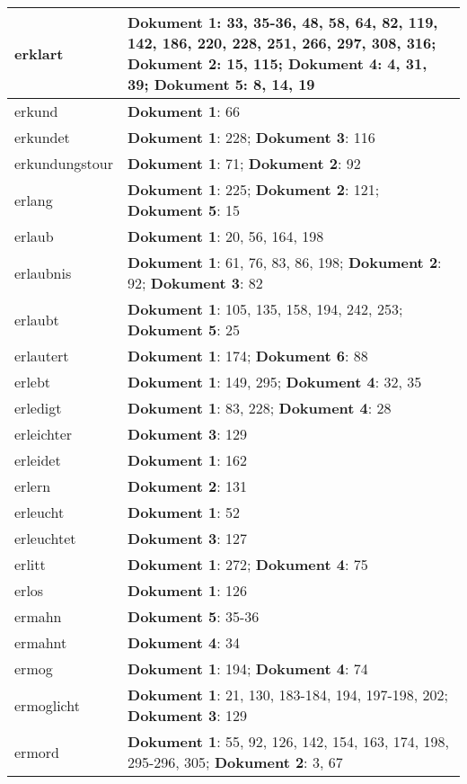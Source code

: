 \documentclass[a5paper]{article}
\begin{document}
\begin{longtable}[l]{|l|p{3in}|}
\hline
erklart & \textbf{Dokument 1}: 33, 35-36, 48, 58, 64, 82, 119, 142, 186, 220, 228, 251, 266, 297, 308, 316; \textbf{Dokument 2}: 15, 115; \textbf{Dokument 4}: 4, 31, 39; \textbf{Dokument 5}: 8, 14, 19 \\
\hline
erkund & \textbf{Dokument 1}: 66 \\
\hline
erkundet & \textbf{Dokument 1}: 228; \textbf{Dokument 3}: 116 \\
\hline
erkundungstour & \textbf{Dokument 1}: 71; \textbf{Dokument 2}: 92 \\
\hline
erlang & \textbf{Dokument 1}: 225; \textbf{Dokument 2}: 121; \textbf{Dokument 5}: 15 \\
\hline
erlaub & \textbf{Dokument 1}: 20, 56, 164, 198 \\
\hline
erlaubnis & \textbf{Dokument 1}: 61, 76, 83, 86, 198; \textbf{Dokument 2}: 92; \textbf{Dokument 3}: 82 \\
\hline
erlaubt & \textbf{Dokument 1}: 105, 135, 158, 194, 242, 253; \textbf{Dokument 5}: 25 \\
\hline
erlautert & \textbf{Dokument 1}: 174; \textbf{Dokument 6}: 88 \\
\hline
erlebt & \textbf{Dokument 1}: 149, 295; \textbf{Dokument 4}: 32, 35 \\
\hline
erledigt & \textbf{Dokument 1}: 83, 228; \textbf{Dokument 4}: 28 \\
\hline
erleichter & \textbf{Dokument 3}: 129 \\
\hline
erleidet & \textbf{Dokument 1}: 162 \\
\hline
erlern & \textbf{Dokument 2}: 131 \\
\hline
erleucht & \textbf{Dokument 1}: 52 \\
\hline
erleuchtet & \textbf{Dokument 3}: 127 \\
\hline
erlitt & \textbf{Dokument 1}: 272; \textbf{Dokument 4}: 75 \\
\hline
erlos & \textbf{Dokument 1}: 126 \\
\hline
ermahn & \textbf{Dokument 5}: 35-36 \\
\hline
ermahnt & \textbf{Dokument 4}: 34 \\
\hline
ermog & \textbf{Dokument 1}: 194; \textbf{Dokument 4}: 74 \\
\hline
ermoglicht & \textbf{Dokument 1}: 21, 130, 183-184, 194, 197-198, 202; \textbf{Dokument 3}: 129 \\
\hline
ermord & \textbf{Dokument 1}: 55, 92, 126, 142, 154, 163, 174, 198, 295-296, 305; \textbf{Dokument 2}: 3, 67 \\

\end{longtable}
\end{document}
